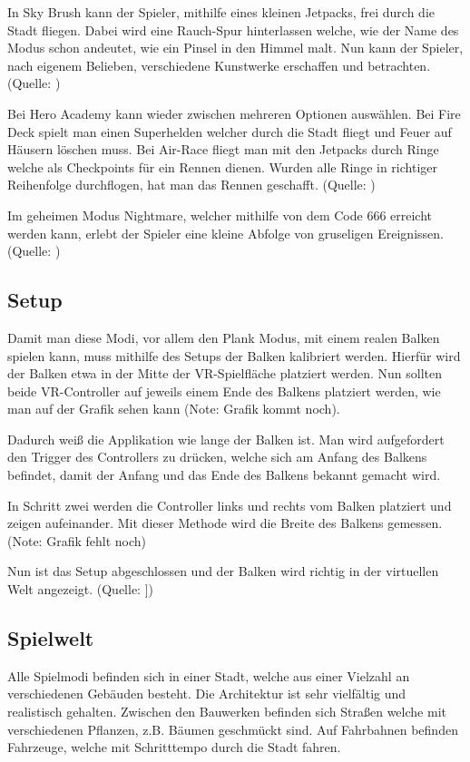 In Sky Brush kann der Spieler, mithilfe eines kleinen Jetpacks, frei durch die Stadt fliegen.
Dabei wird eine Rauch-Spur hinterlassen welche, wie der Name des Modus schon andeutet, wie ein Pinsel in den Himmel malt.
Nun kann der Spieler, nach eigenem Belieben, verschiedene Kunstwerke erschaffen und betrachten.
(Quelle: \cite{ToastGamesSteamPage_2021})

Bei Hero Academy kann wieder zwischen mehreren Optionen auswählen.
Bei Fire Deck spielt man einen Superhelden welcher durch die Stadt fliegt und Feuer auf Häusern löschen muss.
Bei Air-Race fliegt man mit den Jetpacks durch Ringe welche als Checkpoints für ein Rennen dienen.
Wurden alle Ringe in richtiger Reihenfolge durchflogen, hat man das Rennen geschafft.
(Quelle: \cite{ToastGamesSteamPage_2021})

Im geheimen Modus Nightmare, welcher mithilfe von dem Code 666 erreicht werden kann, erlebt der Spieler eine kleine Abfolge von gruseligen Ereignissen.
(Quelle: \cite{ToastGamesVivePort_2021})

\subsection{Setup}
Damit man diese Modi, vor allem den Plank Modus, mit einem realen Balken spielen kann, muss mithilfe des Setups der Balken kalibriert werden.
Hierfür wird der Balken etwa in der Mitte der VR-Spielfläche platziert werden.
Nun sollten beide VR-Controller auf jeweils einem Ende des Balkens platziert werden, wie man auf der Grafik sehen kann (Note: Grafik kommt noch).

Dadurch weiß die Applikation wie lange der Balken ist.
Man wird aufgefordert den Trigger des Controllers zu drücken, welche sich am Anfang des Balkens befindet, damit der Anfang und das Ende des Balkens bekannt gemacht wird.


In Schritt zwei werden die Controller links und rechts vom Balken platziert und zeigen aufeinander.
Mit dieser Methode wird die Breite des Balkens gemessen. (Note: Grafik fehlt noch)


Nun ist das Setup abgeschlossen und der Balken wird richtig in der virtuellen Welt angezeigt.
(Quelle: \cite{ToastGamesSetup_2021}])

\subsection{Spielwelt}
Alle Spielmodi befinden sich in einer Stadt, welche aus einer Vielzahl an verschiedenen Gebäuden besteht.
Die Architektur ist sehr vielfältig und realistisch gehalten.
Zwischen den Bauwerken befinden sich Straßen welche mit verschiedenen Pflanzen, z.B. Bäumen geschmückt sind.
Auf Fahrbahnen befinden Fahrzeuge, welche mit Schritttempo durch die Stadt fahren.

